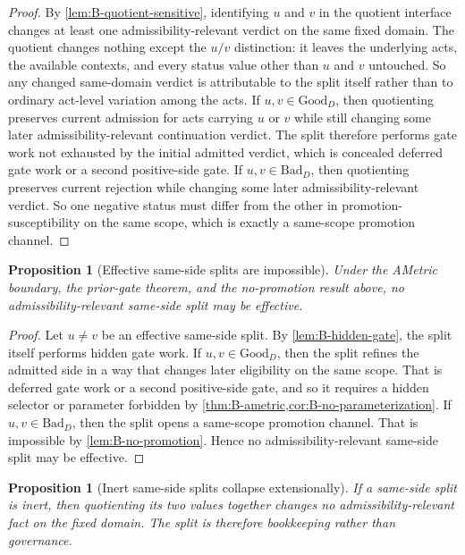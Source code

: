 \documentclass[11pt]{article}
\theoremstyle{plain}
\newtheorem{proposition}[theorem]{Proposition}
\theoremstyle{definition}
\newcommand{\domain}{D}
\newcommand{\Good}{\mathrm{Good}}
\newcommand{\Bad}{\mathrm{Bad}}
\begin{document}
\begin{proof}
By \cref{lem:B-quotient-sensitive}, identifying $u$ and $v$ in the quotient interface changes at least one admissibility-relevant verdict on the same fixed domain. The quotient changes nothing except the $u/v$ distinction: it leaves the underlying acts, the available contexts, and every status value other than $u$ and $v$ untouched. So any changed same-domain verdict is attributable to the split itself rather than to ordinary act-level variation among the acts. If $u,v\in \Good_\domain$, then quotienting preserves current admission for acts carrying $u$ or $v$ while still changing some later admissibility-relevant continuation verdict. The split therefore performs gate work not exhausted by the initial admitted verdict, which is concealed deferred gate work or a second positive-side gate. If $u,v\in \Bad_\domain$, then quotienting preserves current rejection while changing some later admissibility-relevant verdict. So one negative status must differ from the other in promotion-susceptibility on the same scope, which is exactly a same-scope promotion channel.
\end{proof}

\begin{proposition}[Effective same-side splits are impossible]
\label{prop:B-no-effective-split}
Under the AMetric boundary, the prior-gate theorem, and the no-promotion result above, no admissibility-relevant same-side split may be effective.
\end{proposition}

\begin{proof}
Let $u\neq v$ be an effective same-side split. By \cref{lem:B-hidden-gate}, the split itself performs hidden gate work. If $u,v\in \Good_\domain$, then the split refines the admitted side in a way that changes later eligibility on the same scope. That is deferred gate work or a second positive-side gate, and so it requires a hidden selector or parameter forbidden by \cref{thm:B-ametric,cor:B-no-parameterization}. If $u,v\in \Bad_\domain$, then the split opens a same-scope promotion channel. That is impossible by \cref{lem:B-no-promotion}. Hence no admissibility-relevant same-side split may be effective.
\end{proof}

\begin{proposition}[Inert same-side splits collapse extensionally]
\label{prop:B-inert-collapse}
If a same-side split is inert, then quotienting its two values together changes no admissibility-relevant fact on the fixed domain. The split is therefore bookkeeping rather than governance.
\end{proposition}
\end{document}
